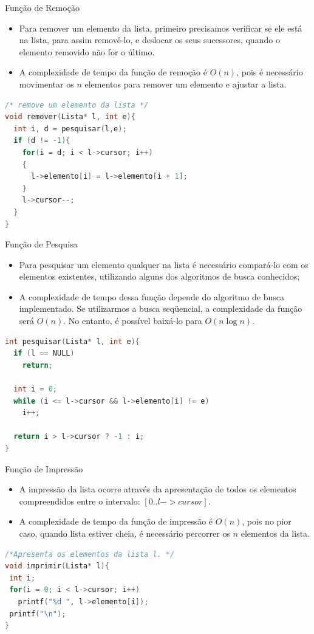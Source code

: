 \begin{frame}[fragile,c]{Função de Remoção} 
	\begin{itemize}
		\item Para remover um elemento da lista, primeiro precisamos verificar se ele está na lista, para assim removê-lo, e deslocar os seus sucessores, quando o elemento removido não for o último.
		\item A complexidade de tempo da função de remoção é $O(n)$, pois é necessário movimentar os $n$ elementos para remover um elemento e ajustar a lista.
	\end{itemize}
	
\footnotesize
\begin{lstlisting}[language=C]
/* remove um elemento da lista */
void remover(Lista* l, int e){     
  int i, d = pesquisar(l,e);
  if (d != -1){
    for(i = d; i < l->cursor; i++)
    {
      l->elemento[i] = l->elemento[i + 1];
    }
    l->cursor--;
  }  
}
\end{lstlisting}	
\end{frame} 

\begin{frame}[fragile]{Função de Pesquisa} 
	\begin{itemize}
		\item Para pesquisar um elemento qualquer na lista é necessário compará-lo com os elementos existentes, utilizando alguns dos algoritmos de busca conhecidos;
		\item A complexidade de tempo dessa função depende do algoritmo de busca implementado. Se utilizarmos a busca seqüencial, a complexidade da função será $O(n)$. No entanto, é possível baixá-lo para $O(n\log n)$.
	\end{itemize}

\footnotesize
\begin{lstlisting}[language=C]
int pesquisar(Lista* l, int e){
  if (l == NULL)
    return;
  
  int i = 0;
  while (i <= l->cursor && l->elemento[i] != e)
    i++;
        
  return i > l->cursor ? -1 : i;
}
\end{lstlisting}
\end{frame}

\begin{frame}[fragile]{Função de Impressão}

\begin{itemize}
		\item A impressão da lista ocorre através da apresentação de todos os elementos compreendidos entre o intervalo: $[0.. l->cursor]$.
		\item A complexidade de tempo da função de impressão é $O(n)$, pois no pior caso, quando lista estiver cheia, é necessário percorrer os $n$ elementos da lista.
	
	\end{itemize}
	
\begin{lstlisting}[language=C]
/*Apresenta os elementos da lista l. */
void imprimir(Lista* l){
 int i;
 for(i = 0; i < l->cursor; i++)
   printf("%d ", l->elemento[i]);
 printf("\n");  
}
\end{lstlisting}	
\end{frame}

